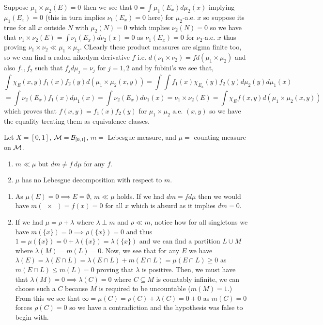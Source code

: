 \documentclass[12pt,a4paper]{article}
\begin{document}
\begin{solution}
Suppose $\mu_1\times\mu_2(E)=0$ then we see that $0=\int\mu_1(E_x)d\mu_2(x)$ implying $\mu_1(E_x)=0$ (this in turn implies $\nu_1(E_x)=0$ here) for $\mu_2$-a.e. $x$ so suppose its true for all $x$ outside $N$ with $\mu_2(N)=0$ which implies $\nu_2(N)=0$ so we have that $\nu_1\times\nu_2(E)=\int\nu_1(E_x)d\nu_2(x)=0$ as $\nu_1(E_x)=0$ for $\nu_2$-a.e. $x$ thus proving $\nu_1\times\nu_2\ll\mu_1\times\mu_2.$ 
CLearly these product measures are sigma finite too, so we can find a radon nikodym derivative $f$ i.e. $d(\nu_1\times\nu_2)=fd(\mu_1\times\mu_2)$ and also $f_1,f_2$ such that $f_jd\mu_j=\nu_j$ for $j=1,2$ and by fubini's we see that,
\[
	\int\chi_E(x,y)f_1(x)f_2(y)d(\mu_1\times\mu_2(x,y))=\int\int f_1(x)\chi_{E_x}(y)f_2(y)d\mu_2(y)d\mu_1(x)
\]
\[
    =\int\nu_2(E_x)f_1(x)d\mu_1(x)=\int\nu_2(E_x)d\nu_1(x)=\nu_1\times\nu_2(E)=\int\chi_Ef(x,y)d(\mu_1\times\mu_2(x,y))
\]
which proves that $f(x,y)=f_1(x)f_2(y)$ for $\mu_1\times\mu_2$ a.e. $(x,y)$ so we have the equality treating them as equivalence classes.
\end{solution}
\begin{problem}\label{prob:3-13}
Let $X=[0,1]$, $\mathcal{M}=\mathcal{B}_{[0,1]}$, $m=$ Lebesgue measure, and $\mu=$ counting measure on $\mathcal{M}$.
\begin{enumerate}[label=\alph*.]
    \item $m\ll\mu$ but $dm\ne f~d\mu$ for any $f$.
    \item $\mu$ has no Lebesgue decomposition with respect to $m$.
\end{enumerate}
\end{problem}
\begin{solution}
\begin{enumerate}[label=\alph*.]
	\item As $\mu(E)=0\implies E=\emptyset$, $m\ll\mu$ holds. 
		If we had $dm=fd\mu$ then we would have $m( \qty{x})=f(x)=0$ for all $x$ which is absurd as it implies $dm=0$. 
    \item If we had $\mu=\rho+\lambda$ where $\lambda\perp m$ and $\rho\ll m$, notice how for all singletons we have $m(\{x\})=0\implies\rho(\{x\})=0$ and thus $1=\mu(\{x\})=0+\lambda(\{x\})=\lambda(\{x\})$ and we can find a partition $L\cup M$ where $\lambda(M)=m(L)=0$. 
        Now, we see that for any $E$ we have $\lambda(E)=\lambda(E\cap L)=\lambda(E\cap L)+m(E\cap L)=\mu(E\cap L)\geq 0$ as $m(E\cap L)\leq m(L)=0$ proving that $\lambda$ is positive.        Then, we must have that $\lambda(M)=0\implies\lambda(C)=0$ where $C\subseteq M$ is countably infinite, we can choose such a $C$ because $M$ is required to be uncountable ($m(M)=1$.) 
        From this we see that $\infty=\mu(C)=\rho(C)+\lambda(C)=0+0$ as $m(C)=0$ forces $\rho(C)=0$ so we have a contradiction and the hypothesis was false to begin with. 
\end{enumerate}
\end{solution}
\end{document}
